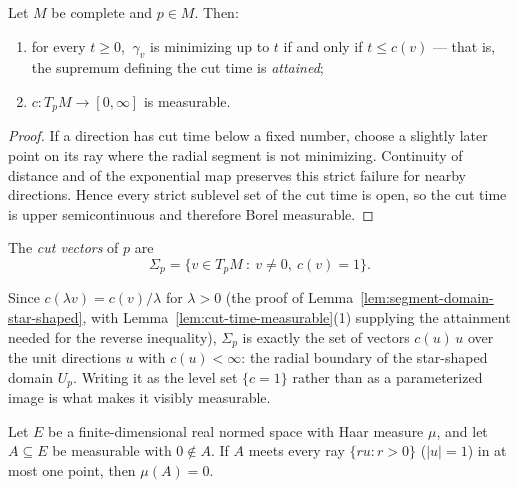 \begin{lemma}
\label{lem:cut-time-measurable}





Let $M$ be complete and $p\in M$. Then:
\begin{enumerate}
\item for every $t\ge0$, $\ \gamma_v$ is minimizing up to $t$ if and
only if $t\le c(v)$ --- that is, the supremum defining the cut time is
\emph{attained};
\item $c\colon T_pM\to[0,\infty]$ is measurable.
\end{enumerate}
\end{lemma}

\begin{proof}
\sketch
{}

If a direction has cut time below a fixed number, choose a slightly later point on its ray where the radial segment is not minimizing. Continuity of distance and of the exponential map preserves this strict failure for nearby directions. Hence every strict sublevel set of the cut time is open, so the cut time is upper semicontinuous and therefore Borel measurable.
\end{proof}

\begin{definition}
\label{def:cut-vectors}





The \emph{cut vectors} of $p$ are
$$\Sigma_p=\{v\in T_pM\ :\ v\neq0,\ c(v)=1\}.$$
\end{definition}

Since $c(\lambda v)=c(v)/\lambda$ for $\lambda>0$ (the proof of
Lemma~\ref{lem:segment-domain-star-shaped}, with
Lemma~\ref{lem:cut-time-measurable}(1) supplying the attainment needed
for the reverse inequality), $\Sigma_p$ is exactly the set of vectors
$c(u)\,u$ over the unit directions $u$ with $c(u)<\infty$: the radial
boundary of the star-shaped domain $U_p$. Writing it as the level set
$\{c=1\}$ rather than as a parameterized image is what makes it
visibly measurable.

\begin{lemma}
\label{lem:radial-graph-null}




Let $E$ be a finite-dimensional real normed space with Haar measure
$\mu$, and let $A\subseteq E$ be measurable with $0\notin A$. If $A$
meets every ray $\{ru : r>0\}$ ($\lvert u\rvert=1$) in at most one
point, then $\mu(A)=0$.
\end{lemma}


